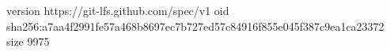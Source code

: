 version https://git-lfs.github.com/spec/v1
oid sha256:a7aa4f2991fe57a468b8697ec7b727ed57c84916f855e045f387c9ea1ca23372
size 9975

